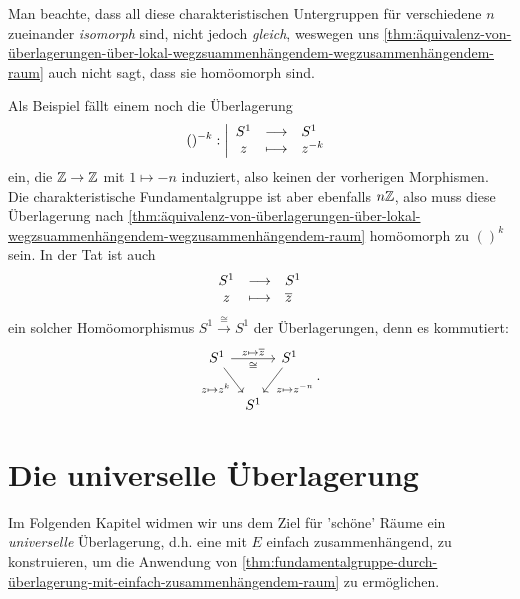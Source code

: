 \begin{example}
\begin{itemize}
        Man beachte, dass all diese charakteristischen Untergruppen für verschiedene $n$ zueinander \textit{isomorph} sind, nicht jedoch \textit{gleich}, weswegen uns \autoref{thm:äquivalenz-von-überlagerungen-über-lokal-wegzsuammenhängendem-wegzusammenhängendem-raum} auch nicht sagt, dass sie homöomorph sind.
    \end{itemize}
    Als Beispiel fällt einem noch die Überlagerung
        \begin{equation*}
            ()^{-k} : \left| \begin{array}{c c l} 
        S^1 & \longrightarrow & S^1 \\
        z & \longmapsto &  z^{-k}
        \end{array} \right.
    \end{equation*}
    ein, die  $\mathbb{Z} \to  \mathbb{Z}$ mit $1 \mapsto -n$ induziert, also keinen der vorherigen Morphismen. Die charakteristische Fundamentalgruppe ist aber ebenfalls  $n\mathbb{Z}$, also muss diese Überlagerung nach \autoref{thm:äquivalenz-von-überlagerungen-über-lokal-wegzsuammenhängendem-wegzusammenhängendem-raum} homöomorph zu $()^k$ sein. In der Tat ist auch
        \begin{equation*}
        \begin{array}{c c l} 
        S^1 & \longrightarrow & S^1 \\
        z & \longmapsto &  \overline{z}
        \end{array}
    \end{equation*}
    ein solcher Homöomorphismus $S^1 \stackrel{\cong}{\longrightarrow} S^1$ der Überlagerungen, denn es kommutiert:
    \[
        \begin{tikzcd}[column sep = tiny]
            S^1 \ar{rr}{z \mapsto \overline{z}}[swap]{\cong} \ar{dr}[swap]{z \mapsto z^k}& & S^1 \ar{dl}{z \mapsto z^{-n}} \\
                                                                                         & S^1
    \end{tikzcd}
    .\] 
\end{example}

\section{Die universelle Überlagerung}

Im Folgenden Kapitel widmen wir uns dem Ziel für 'schöne' Räume ein \textit{universelle} Überlagerung, d.h. eine mit $E$ einfach zusammenhängend, zu konstruieren, um die Anwendung von \autoref{thm:fundamentalgruppe-durch-überlagerung-mit-einfach-zusammenhängendem-raum} zu ermöglichen.


